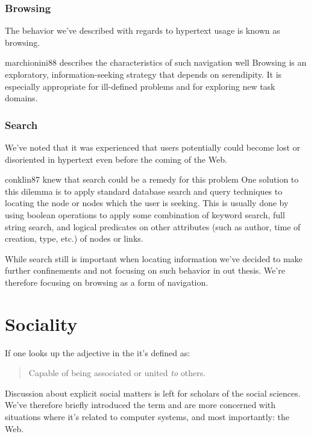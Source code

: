 \subsubsection{Browsing}
The behavior we've described with regards to hypertext usage is known as
browsing.
\begin{fullquote}[p.~71]{marchionini88}{%
  describes the characteristics of such navigation well}
    Browsing is an exploratory, information-seeking
    strategy that depends on serendipity. It is
    especially appropriate for ill-defined problems
    and for exploring new task domains.
\end{fullquote}

\subsubsection{Search}
\label{section:background.navigation.navigation.on.the.web.search}
We've noted that it was experienced that users potentially could become lost
or disoriented in hypertext even before the coming of the Web.
\begin{fullquote}[p.~38]{conklin87}{%
  knew that search could be a remedy for this problem}
    One solution to this dilemma is to apply standard data\-base search and
    query techniques to locating the node or nodes which the user is seeking.
    This is usually done by using boolean operations to apply some combination
    of keyword search, full string search, and logical predicates on other
    attributes (such as author, time of creation, type, etc.)
    of nodes or links.
\end{fullquote}

While search still is important when locating information we've decided
to make further confinements and not focusing on such behavior in out thesis.
We're therefore focusing on browsing as a form of navigation.

\section{Sociality}

If one looks up the adjective  in the
 \citep[p.~905]{simpson89}
it's defined as:

\begin{quote}
  Capable of being associated or united \emph{to} others.
\end{quote}

Discussion about explicit social matters is left for scholars of the social
sciences. We've therefore briefly introduced the term and are more concerned
with situations where it's related to computer systems, and most importantly:
the Web.

